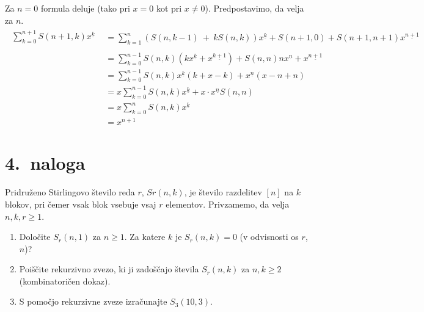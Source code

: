 \documentclass[11pt]{article}
\begin{document}
Za \(n = 0\) formula deluje (tako pri \(x=0\) kot pri \(x \ne 0\)). Predpostavimo, da velja za \(n\).
\begin{align*}
    \begin{array}{l}
   \sum_{k=0}^{n+1} S( n+1,k) x^{\underline{k}}\\
   \end{array} & =\sum _{k=1}^{n}( S( n,k-1) \ +\ kS( n,k)) x^{\underline{k}} +S( n+1,0) +S( n+1,n+1) x^{\underline{n+1}}\\
    & =\sum_{k=0}^{n-1} S( n,k)\left(kx^{\underline{k}} +x^{\underline{k+1}}\right) +S( n,n) nx^{\underline{n}} +x^{\underline{n+1}}\\
    & =\sum_{k=0}^{n-1} S( n,k) x^{\underline{k}}( k+x-k) +x^{\underline{n}}( x-n+n)\\
    & =x\sum_{k=0}^{n-1} S( n,k) x^{\underline{k}} +x\cdot x^{\underline{n}} S( n,n)\\
    & =x\sum_{k=0}^{n} S( n,k) x^{\underline{k}} \\
    & = x^{n+1}
\end{align*}

\section*{4.~naloga}
Pridruženo Stirlingovo število reda \(r\), \(Sr(n, k)\), je število razdelitev \([n]\) na \(k\) blokov, pri čemer
vsak blok vsebuje vsaj \(r\) elementov. Privzamemo, da velja \(n, k, r \ge 1\).
\begin{enumerate}[label=(\alph*)]
    \item Določite \(S_r\left(n, 1\right)\) za \(n \ge 1\). Za katere \(k\) je \(S_r\left(n, k\right) = 0\) (v odvisnosti os \(r\), \(n\))?
    \item Poiščite rekurzivno zvezo, ki ji zadoščajo števila \(S_r\left(n, k\right)\) za \(n, k \ge 2\) (kombinatoričen dokaz).
    \item S pomočjo rekurzivne zveze izračunajte \(S_3\left(10, 3\right)\).
\end{enumerate}
\end{document}

